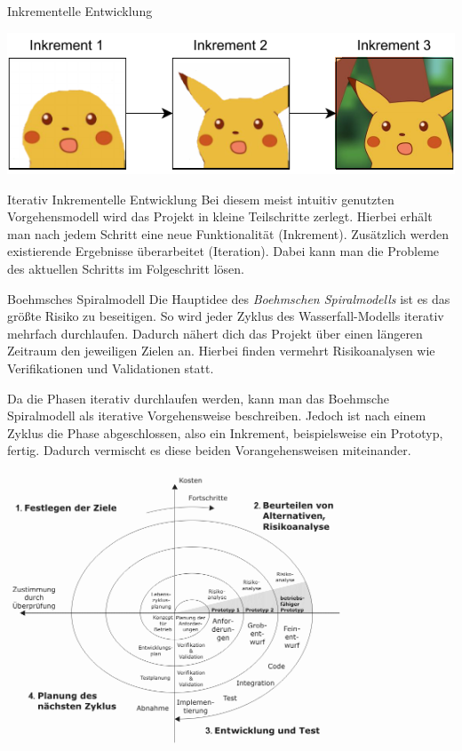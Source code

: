 \begin{example}{Inkrementelle Entwicklung}
    \begin{center}
        \includegraphics{includes/figures/example_incremental_development.pdf}
    \end{center}
\end{example}

\begin{defi}{Iterativ Inkrementelle Entwicklung}
    Bei diesem meist intuitiv genutzten Vorgehensmodell wird das Projekt in kleine Teilschritte zerlegt.
    Hierbei erhält man nach jedem Schritt eine neue Funktionalität (Inkrement).
    Zusätzlich werden existierende Ergebnisse überarbeitet (Iteration).
    Dabei kann man die Probleme des aktuellen Schritts im Folgeschritt lösen.
\end{defi}

\begin{bonus}{Boehmsches Spiralmodell}
    Die Hauptidee des \emph{Boehmschen Spiralmodells} ist es das größte Risiko zu beseitigen.
    So wird jeder Zyklus des Wasserfall-Modells iterativ mehrfach durchlaufen.
    Dadurch nähert dich das Projekt über einen längeren Zeitraum den jeweiligen Zielen an.
    Hierbei finden vermehrt Risikoanalysen wie Verifikationen und Validationen statt.

    Da die Phasen iterativ durchlaufen werden, kann man das Boehmsche Spiralmodell als iterative Vorgehensweise beschreiben.
    Jedoch ist nach einem Zyklus die Phase abgeschlossen, also ein Inkrement, beispielsweise ein Prototyp, fertig.
    Dadurch vermischt es diese beiden Vorangehensweisen miteinander.

    \begin{center}
        \includegraphics[width=0.75\textwidth]{includes/figures/bonus_boehmsches_spiralmodell.png}
    \end{center}
\end{bonus}

